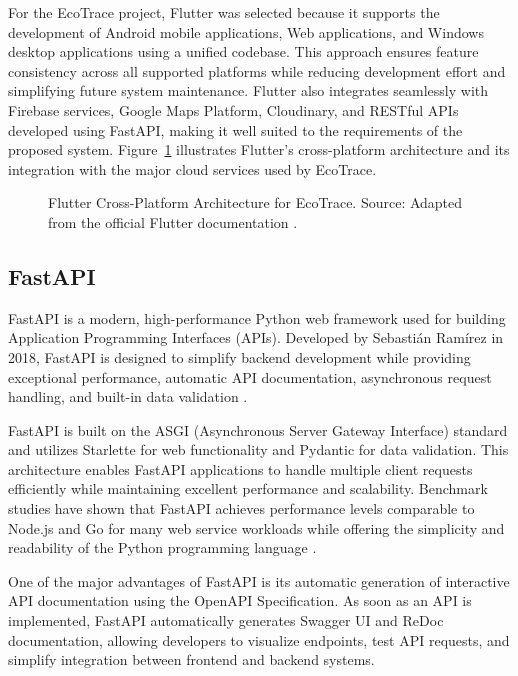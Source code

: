 For the EcoTrace project, Flutter was selected because it supports the
development of Android mobile applications, Web applications, and Windows
desktop applications using a unified codebase. This approach ensures feature
consistency across all supported platforms while reducing development effort and
simplifying future system maintenance. Flutter also integrates seamlessly with
Firebase services, Google Maps Platform, Cloudinary, and RESTful APIs
developed using FastAPI, making it well suited to the requirements of the
proposed system. Figure~\ref{fig:flutter-arch} illustrates Flutter's cross-platform
architecture and its integration with the major cloud services used by EcoTrace.

\begin{figure}[H]
  \centering
  \caption{Flutter Cross-Platform Architecture for EcoTrace. Source: Adapted from the official Flutter documentation \citep{google2025flutter}.}
  \label{fig:flutter-arch}
\end{figure}

\subsection{FastAPI}

FastAPI is a modern, high-performance Python web framework used for building
Application Programming Interfaces (APIs). Developed by Sebasti\'an Ram\'irez in
2018, FastAPI is designed to simplify backend development while providing
exceptional performance, automatic API documentation, asynchronous request
handling, and built-in data validation \citep{ramirez2025}.

FastAPI is built on the ASGI (Asynchronous Server Gateway Interface) standard
and utilizes Starlette for web functionality and Pydantic for data validation. This
architecture enables FastAPI applications to handle multiple client requests
efficiently while maintaining excellent performance and scalability. Benchmark
studies have shown that FastAPI achieves performance levels comparable to
Node.js and Go for many web service workloads while offering the simplicity and
readability of the Python programming language \citep{ramirez2023}.

One of the major advantages of FastAPI is its automatic generation of
interactive API documentation using the OpenAPI Specification. As soon as an API
is implemented, FastAPI automatically generates Swagger UI and ReDoc
documentation, allowing developers to visualize endpoints, test API requests, and
simplify integration between frontend and backend systems.

